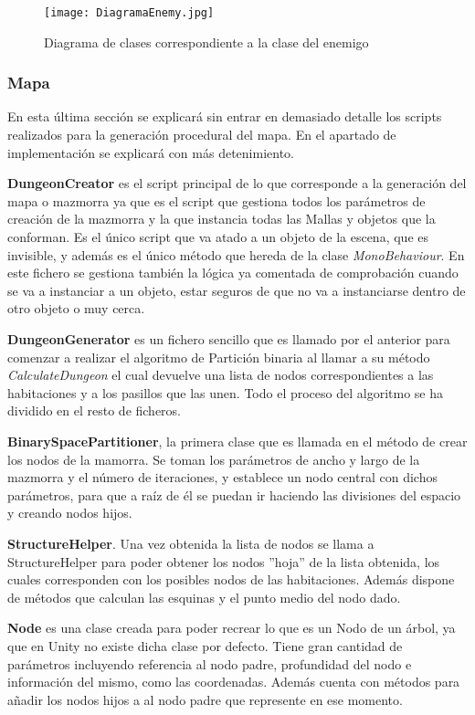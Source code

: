 \begin{figure}[H]
    \centering
    \texttt{[image: DiagramaEnemy.jpg]}
    \caption{Diagrama de clases correspondiente a la clase del enemigo}
\end{figure}

\subsubsection{Mapa}

En esta última sección se explicará sin entrar en demasiado detalle los scripts realizados para la generación procedural del mapa. En el apartado de implementación se explicará con más detenimiento.

\textbf{DungeonCreator} es el script principal de lo que corresponde a la generación del mapa o mazmorra ya que es el script que gestiona todos los parámetros de creación de la mazmorra y la que instancia todas las Mallas y objetos que la conforman. Es el único script que va atado a un objeto de la escena, que es invisible, y además es el único método que hereda de la clase \textit{MonoBehaviour}. En este fichero se gestiona también la lógica ya comentada de comprobación cuando se va a instanciar a un objeto, estar seguros de que no va a instanciarse dentro de otro objeto o muy cerca.

\textbf{DungeonGenerator} es un fichero sencillo que es llamado por el anterior para comenzar a realizar el algoritmo de Partición binaria al llamar a su método \textit{CalculateDungeon} el cual devuelve una lista de nodos correspondientes a las habitaciones y a los pasillos que las unen. Todo el proceso del algoritmo se ha dividido en el resto de ficheros.

\textbf{BinarySpacePartitioner}, la primera clase que es llamada en el método de crear los nodos de la mamorra. Se toman los parámetros de ancho y largo de la mazmorra y el número de iteraciones, y establece un nodo central con dichos parámetros, para que a raíz de él se puedan ir haciendo las divisiones del espacio y creando nodos hijos.

\textbf{StructureHelper}. Una vez obtenida la lista de nodos se llama a StructureHelper para poder obtener los nodos ''hoja'' de la lista obtenida, los cuales corresponden con los posibles nodos de las habitaciones. Además dispone de métodos que calculan las esquinas y el punto medio del nodo dado.

\textbf{Node} es una clase creada para poder recrear lo que es un Nodo de un árbol, ya que en Unity no existe dicha clase por defecto. Tiene gran cantidad de parámetros incluyendo referencia al nodo padre, profundidad del nodo e información del mismo, como las coordenadas. Además cuenta con métodos para añadir los nodos hijos a al nodo padre que represente en ese momento. 

